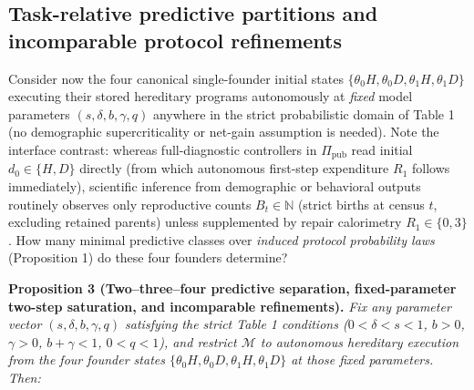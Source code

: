 \documentclass[11pt,a4paper]{article}
\begin{document}
\subsection{Task-relative predictive partitions and incomparable
protocol
refinements}\label{task-relative-predictive-partitions-and-incomparable-protocol-refinements}

Consider now the four canonical single-founder initial states
\(\{\theta_0 H, \theta_0 D, \theta_1 H, \theta_1 D\}\) executing their
stored hereditary programs autonomously at \emph{fixed} model parameters
\((s,\delta,b,\gamma,q)\) anywhere in the strict probabilistic domain of
Table 1 (no demographic supercriticality or net-gain assumption is
needed). Note the interface contrast: whereas full-diagnostic
controllers in \(\Pi_{\mathrm{pub}}\) read initial \(d_0 \in \{H, D\}\)
directly (from which autonomous first-step expenditure \(R_1\) follows
immediately), scientific inference from demographic or behavioral
outputs routinely observes only reproductive counts
\(B_t \in \mathbb{N}\) (strict births at census \(t\), excluding
retained parents) unless supplemented by repair calorimetry
\(R_1 \in \{0, 3\}\). How many minimal predictive classes over
\emph{induced protocol probability laws} (Proposition 1) do these four
founders determine?

\textbf{Proposition 3 (Two--three--four predictive separation,
fixed-parameter two-step saturation, and incomparable refinements).}
\emph{Fix any parameter vector \((s,\delta,b,\gamma,q)\) satisfying the
strict Table 1 conditions (\(0 < \delta < s < 1\), \(b > 0\),
\(\gamma > 0\), \(b + \gamma < 1\), \(0 < q < 1\)), and restrict
\(\mathcal{M}\) to autonomous hereditary execution from the four founder
states \(\{\theta_0 H, \theta_0 D, \theta_1 H, \theta_1 D\}\) at those
fixed parameters. Then:}
\end{document}

